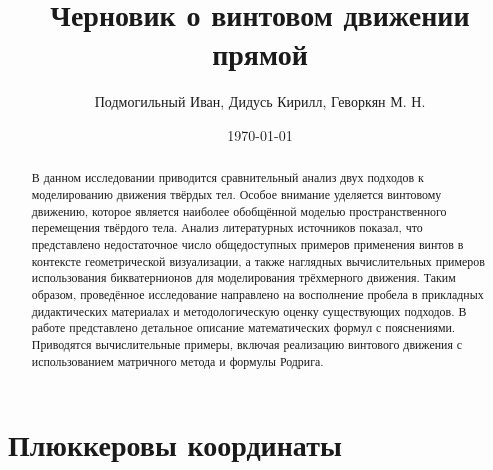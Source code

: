 

\author{Подмогильный Иван, Дидусь Кирилл, Геворкян М. Н.}
\date{\today}
\title{Черновик о винтовом движении прямой}


  
  \maketitle

  \begin{abstract}
    В данном исследовании приводится сравнительный анализ двух подходов к моделированию движения твёрдых тел. Особое внимание уделяется винтовому движению,
      которое является наиболее обобщённой моделью пространственного перемещения твёрдого тела. Анализ литературных источников показал, что представлено
      недостаточное число общедоступных примеров применения винтов в контексте геометрической визуализации, а также наглядных вычислительных примеров использования
        бикватернионов для моделирования трёхмерного движения. Таким образом, проведённое исследование направлено на восполнение пробела в прикладных дидактических
        материалах и методологическую оценку существующих подходов. В работе представлено детальное описание математических формул с пояснениями. Приводятся 
        вычислительные примеры, включая реализацию винтового движения с использованием матричного метода и формулы Родрига.
  \end{abstract}


  


  \section{Плюккеровы координаты}

